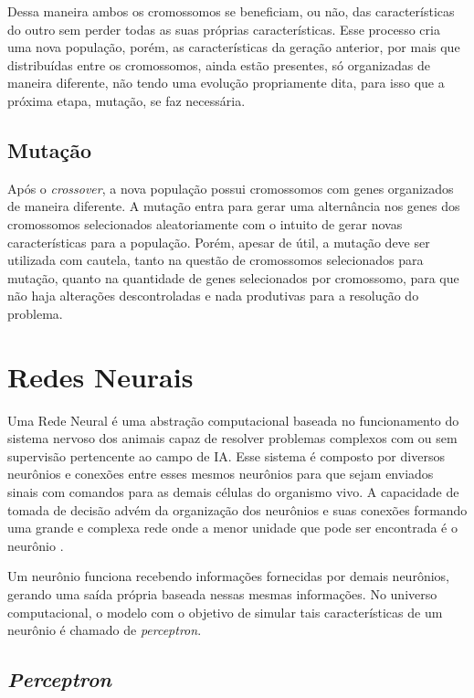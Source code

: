 Dessa maneira ambos os cromossomos se beneficiam, ou não, das
características do outro sem perder todas as suas próprias
características. Esse processo cria uma nova população, porém,
as características da geração anterior, por mais que
distribuídas entre os cromossomos, ainda estão presentes, só
organizadas de maneira diferente, não tendo uma evolução
propriamente dita, para isso que a próxima etapa, mutação, se
faz necessária.

\subsection{Muta{\c c}{\~a}o}

Após o \textit{crossover}, a nova população possui cromossomos
com genes organizados de maneira diferente. A mutação entra
para gerar uma alternância nos genes dos cromossomos
selecionados aleatoriamente com o intuito de gerar novas
características para a população. Porém, apesar de útil, a
mutação deve ser utilizada com cautela, tanto na questão de
cromossomos selecionados para mutação, quanto na quantidade de
genes selecionados por cromossomo, para que não haja
alterações descontroladas e nada produtivas para a resolução
do problema.

\section{Redes Neurais}

Uma Rede Neural é uma abstração computacional baseada no 
funcionamento do sistema nervoso dos animais capaz de resolver problemas 
complexos com ou sem supervisão pertencente ao campo de IA. Esse sistema é 
composto por diversos neurônios e conexões entre esses mesmos neurônios para 
que sejam enviados sinais com comandos para as demais células do organismo 
vivo. A capacidade de tomada de decisão advém da organização dos neurônios e 
suas conexões formando uma grande e complexa rede onde a menor unidade que 
pode ser encontrada é o neurônio \cite{rojas2013neural}.

Um neurônio funciona recebendo informações fornecidas por demais neurônios,
gerando uma saída própria baseada nessas mesmas informações. No universo
computacional, o modelo com o objetivo de simular tais características de um
neurônio é chamado de \textit{perceptron}.

\subsection{\textit{Perceptron}}

